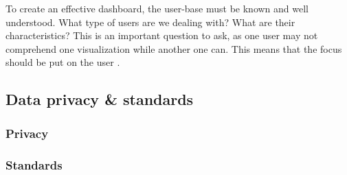     \noindent To create an effective dashboard, the user-base must be known and well understood. What type of users are we dealing with? What are their characteristics? This is an important question to ask, as one user may not comprehend one visualization while another one can. This means that the focus should be put on the user \cite{brath2004dashboard}.
        

    \subsection{Data privacy \& standards}
        
        \subsubsection{Privacy} \label{2_privacy}

        \subsubsection{Standards} \label{2_standards}

    

        

        


